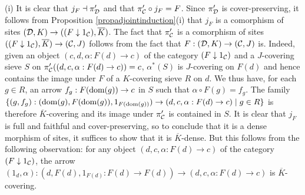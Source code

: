 \documentclass[a4paper,12pt]{article}
\begin{document}
\begin{proofs}
	(i) It is clear that $j_{F}\dashv \pi_{\cal D}'$ and that $\pi_{\cal C}'\circ j_{F}=F$. Since $\pi_{\cal D}'$ is cover-preserving, it follows from Proposition \ref{propadjointinduction}(i) that $j_{F}$ is a comorphism of sites $({\cal D}, K) \to ((F \downarrow 1_{\cal C}), \overline{K})$.	The fact that $\pi_{\cal C}'$ is a comorphism of sites $((F \downarrow 1_{\cal C}), \overline{K})\to ({\cal C}, J)$ follows from the fact that $F:({\cal D}, K)\to ({\cal C}, J)$ is. Indeed, given an object $(c,d, \alpha:F(d)\to c)$ of the category $(F \downarrow 1_{\cal C})$ and a $J$-covering sieve $S$ on $\pi_{\cal C}'((d, c, \alpha:F(d)\to c))=c$, $\alpha^{\ast}(S)$ is $J$-covering on $F(d)$ and hence contains the image under $F$ of a $K$-covering sieve $R$ on $d$. We thus have, for each $g\in R$, an arrow $f_{g}:F(\textup{dom}(g))\to c$ in $S$ such that $\alpha \circ F(g)=f_{g}$. The family $\{ (g, f_{g}):(\textup{dom}(g), F(\textup{dom}(g)), 1_{F(\textup{dom}(g))} ) \to (d, c, \alpha:F(d)\to c) \mid g\in R\}$ is therefore $\overline{K}$-covering and its image under $\pi_{\cal C}'$ is contained in $S$. It is clear that $j_{F}$ is full and faithful and cover-preserving, so to conclude that it is a dense morphism of sites, it suffices to show that it is $\overline{K}$-dense. But this follows from the following observation: for any object $(d,c, \alpha:F(d)\to c)$ of the category $(F \downarrow 1_{\cal C})$, the arrow $(1_{d}, \alpha):(d, F(d), 1_{F(d)}:F(d)\to F(d)) \to (d,c, \alpha:F(d)\to c)$ is $\overline{K}$-covering. 
	

\end{proofs}
\end{document}
